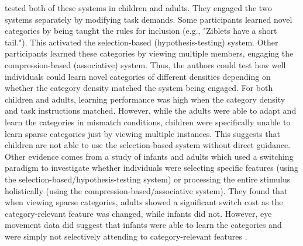 \documentclass[../dissertation.tex]{subfiles}
\begin{document}
	\citet{Kloos2008} tested both of these systems in children and adults. They engaged the two systems separately by modifying task demands. Some participants learned novel categories by being taught the rules for inclusion (e.g., "Ziblets have a short tail."). This activated the selection-based (hypothesis-testing) system. Other participants learned these categories by viewing multiple members, engaging the compression-based (associative) system. Thus, the authors could test how well individuals could learn novel categories of different densities depending on whether the category density matched the system being engaged. For both children and adults, learning performance was high when the category density and task instructions matched. However, while the adults were able to adapt and learn the categories in mismatch conditions, children were specifically unable to learn sparse categories just by viewing multiple instances. This suggests that children are not able to use the selection-based system without direct guidance. Other evidence comes from a study of infants and adults which used a switching paradigm to investigate whether individuals were selecting specific features (using the selection-based/hypothesis-testing system) or processing the entire stimulus holistically (using the compression-based/associative system). They found that when viewing sparse categories, adults showed a significant switch cost as the category-relevant feature was changed, while infants did not. However, eye movement data did suggest that infants were able to learn the categories and were simply not selectively attending to category-relevant features \citep{Best2013}. \par
\end{document}
